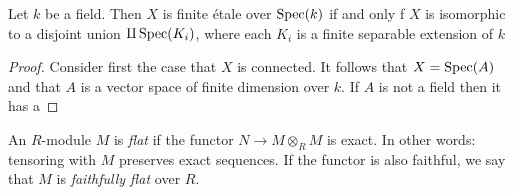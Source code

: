 \begin{proposition}
	Let $k$ be a field. Then $X$ is finite \'etale over $\operatorname{Spec}(k)$ if and only f $X$ is isomorphic to a disjoint union $\amalg \operatorname{Spec}(K_i)$, where each $K_i$ is a finite separable extension of $k$
\end{proposition}
\begin{proof}
	Consider first the case that $X$ is connected. It follows that $X = \operatorname{Spec}(A)$ and that $A$ is a vector space of finite dimension over $k$. If $A$ is not a field then it has a
\end{proof}



\begin{definition}
	An $R$-module $M$ is \textit{flat} if the functor $N \to M \otimes_R M$ is exact. In other words: tensoring with $M$ preserves exact sequences. If the functor is also faithful, we say that $M$ is \textit{faithfully flat} over $R$.
\end{definition}
